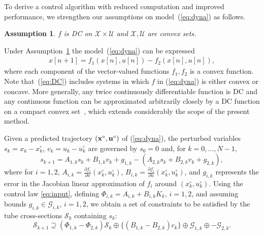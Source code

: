 \documentclass[a4paper, 10 pt, conference]{IEEEconf}
\newtheorem{assumption}{Assumption}
\def\G{\mathcal{G}}
\def\S{\mathcal{S}}
\def\U{\mathcal{U}}
\def\X{\mathcal{X}}
\begin{document}
To derive a control algorithm with reduced computation and improved performance, we strengthen our assumptions
on model~(\ref{eq:dyna}) as follows.

\begin{assumption}\label{assump:dc}
$f$ is DC on $\X\times\U$ and $\X,\U$ are convex sets.
\end{assumption}

Under Assumption~\ref{assump:dc} the model~(\ref{eq:dyna}) can be expressed
%
\begin{align}
\label{eq:DC}
x[n+1] =  f_1(x[n], u[n]) -  f_2(x[n], u[n]),  
\end{align}
where each component of the vector-valued functions $f_1, f_2$ is a convex function. 
%
Note that~(\ref{eq:DC}) includes systems in which $f$ in (\ref{eq:dyna}) is either convex or concave. 
%
More generally, any twice continuously differentiable function is DC and any continuous function can be approximated arbitrarily closely by a DC function on a compact convex set~\cite{horst99:dcprog,hartman59:dcfun}, which extends considerably the scope of the present method.

Given a predicted trajectory $({\bf x}^\circ, {\bf u}^\circ)$ of (\ref{eq:dyna}), the perturbed variables $s_k = x_k - x_k^\circ$, $v_k = u_k - u_k^\circ$ are governed by $s_0=0$ and, for $k=0,\ldots,N-1$,
%
\begin{equation*}
s_{k+1} =A_{1, k} s_k + B_{1, k} v_k + g_{1, k} - (A_{2, k} s_k + B_{2, k} v_k + g_{2, k}), 
\end{equation*}
where for $i=1,2$, $A_{i, k} = \frac{\partial f_i}{\partial x}(x_k^\circ, u_k^\circ)$, $B_{i, k} = \frac{\partial f_i}{\partial u}(x_k^\circ, u_k^\circ)$,
%
%
and $g_{i,k} $ represents the error in the Jacobian linear approximation of $f_i$ around $(x_k^\circ,u_k^\circ)$.
%
Using the control law \eqref{eq:input}, defining
$\Phi_{i, k}=A_{i, k}+B_{i, k} K_{k}$, $i =1, 2$, 
and assuming bounds $g_{i, k} \in \G_{i, k}$, $i=1,2$, we obtain a set of constraints to be satisfied by the tube cross-sections $\S_k$ containing $s_k$:
%
\begin{equation}
\label{eq:tube}
\S_{k+1} \supseteq (\Phi_{1, k} - \Phi_{2, k})\S_k \oplus \{ (B_{1, k} - B_{2, k}) c_k\} \oplus \G_{1, k} \oplus -\G_{2, k}. 
\end{equation}
\end{document}
